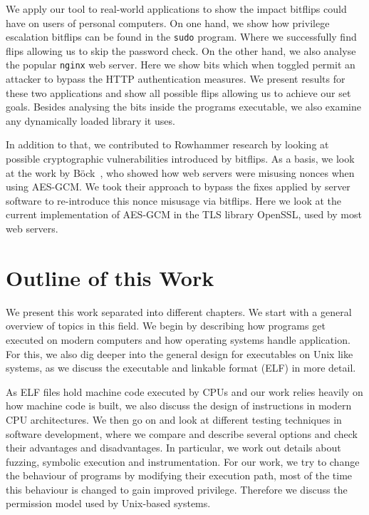 We apply our tool to real-world applications to show the impact bitflips could
have on users of personal computers. On one hand, we show how privilege
escalation bitflips can be found in the \texttt{sudo} program. Where we
successfully find flips allowing us to skip the password check. On the other
hand, we also analyse the popular \texttt{nginx} web server. Here we show bits
which when toggled permit an attacker to bypass the HTTP authentication
measures. We present results for these two applications and show all possible
flips allowing us to achieve our set goals. Besides analysing the bits inside
the program\textquotesingle s executable, we also examine any dynamically loaded
library it uses.

In addition to that, we contributed to Rowhammer research by looking at possible
cryptographic vulnerabilities introduced by bitflips. As a basis, we look at the
work by Böck~\etal\cite{gcmnonceattack}, who showed how web servers were
misusing nonces when using AES-GCM. We took their approach to bypass the fixes
applied by server software to re-introduce this nonce misusage via bitflips.
Here we look at the current implementation of AES-GCM in the TLS library
OpenSSL, used by most web servers.

\section{Outline of this Work}

We present this work separated into different chapters. We start with a general
overview of topics in this field. We begin by describing how programs get
executed on modern computers and how operating systems handle application. For
this, we also dig deeper into the general design for executables on Unix like
systems, as we discuss the executable and linkable format (ELF) in more detail.

As ELF files hold machine code executed by CPUs and our work relies heavily on
how machine code is built, we also discuss the design of instructions in modern
CPU architectures.  We then go on and look at different testing techniques in
software development, where we compare and describe several options and check
their advantages and disadvantages. In particular, we work out details about
fuzzing, symbolic execution and instrumentation. For our work, we try to change
the behaviour of programs by modifying their execution path, most of the time
this behaviour is changed to gain improved privilege. Therefore we discuss the
permission model used by Unix-based systems.


